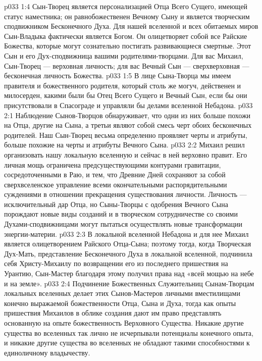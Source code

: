 \vs p033 1:4 Сын\hyp{}Творец является персонализацией Отца Всего Сущего, имеющей статус наместника; он равнобожественен Вечному Сыну и является творческим сподвижником Бесконечного Духа. Для нашей вселенной и всех обитаемых миров Сын\hyp{}Владыка фактически является Богом. Он олицетворяет собой все Райские Божества, которые могут сознательно постигать развивающиеся смертные. Этот Сын и его Дух\hyp{}сподвижница  вашими родителями\hyp{}творцами. Для вас Михаил, Сын\hyp{}Творец --- верховная личность; для вас Вечный Сын --- сверхверховная --- бесконечная личность Божества.
\vs p033 1:5 \pc В лице Сына\hyp{}Творца мы имеем правителя и божественного родителя, который столь же могуч, действенен и милосерден, какими были бы Отец Всего Сущего и Вечный Сын, если бы они присутствовали в Спасограде и управляли бы делами вселенной Небадона.
\vs p033 2:1 Наблюдение Сынов\hyp{}Творцов обнаруживает, что одни из них больше похожи на Отца, другие на Сына, а третьи являют собой смесь черт обоих бесконечных родителей. Наш Сын\hyp{}Творец весьма определенно проявляет черты и атрибуты, больше похожие на черты и атрибуты Вечного Сына.
\vs p033 2:2 Михаил решил организовать нашу локальную вселенную и сейчас в ней верховно правит. Его личная мощь ограничена предсуществующими контурами гравитации, сосредоточенными в Раю, и тем, что Древние Дней сохраняют за собой сверхвселенское управление всеми окончательными распорядительными суждениями в отношении прекращения существования личности. Личность --- исключительный дар Отца, но Сыны\hyp{}Творцы с одобрения Вечного Сына порождают новые виды созданий и в творческом сотрудничестве со своими Духами\hyp{}сподвижницами могут пытаться осуществлять новые трансформации энергии\hyp{}материи.
\vs p033 2:3 \pc В локальной вселенной Небадона и для нее Михаил является олицетворением Райского Отца\hyp{}Сына; поэтому тогда, когда Творческая Дух\hyp{}Мать, представление Бесконечного Духа в локальной вселенной, подчинила себя Христу\hyp{}Михаилу по возвращении его из последнего пришествия на Урантию, Сын\hyp{}Мастер благодаря этому получил права над «всей мощью на небе и на земле».
\vs p033 2:4 Подчинение Божественных Служительниц Сынам\hyp{}Творцам локальных вселенных делает этих Сынов\hyp{}Мастеров личными вместилищами конечно выражаемой божественности Отца, Сына и Духа, тогда как опыты пришествия Михаилов в облике создания дают им право представлять основанную на опыте божественность Верховного Существа. Никакие другие существа во вселенных так лично не исчерпывали потенциалы конечного опыта, и никакие другие существа во вселенных не обладают такими способностями к единоличному владычеству.
